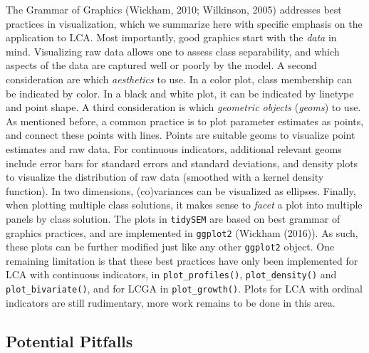 \documentclass[
  ,man,floatsintext]{apa6}
\begin{document}
The Grammar of Graphics (Wickham, 2010; Wilkinson, 2005)
addresses best practices in visualization,
which we summarize here with specific emphasis on the application to LCA.
Most importantly, good graphics start with the \emph{data} in mind.
Visualizing raw data allows one to assess class separability,
and which aspects of the data are captured well or poorly by the model.
A second consideration are which \emph{aesthetics} to use.
In a color plot, class membership can be indicated by color.
In a black and white plot, it can be indicated by linetype and point shape.
A third consideration is which \emph{geometric objects} (\emph{geoms}) to use.
As mentioned before, a common practice is to plot parameter estimates as points,
and connect these points with lines.
Points are suitable geoms to visualize point estimates and raw data.
For continuous indicators, additional relevant geoms include error bars for standard errors and standard deviations,
and density plots to visualize the distribution of raw data (smoothed with a kernel density function).
In two dimensions, (co)variances can be visualized as ellipses.
Finally, when plotting multiple class solutions,
it makes sense to \emph{facet} a plot into multiple panels by class solution.
The plots in \texttt{tidySEM} are based on best grammar of graphics practices,
and are implemented in \texttt{ggplot2} (Wickham (2016)).
As such, these plots can be further modified just like any other \texttt{ggplot2} object.
One remaining limitation is that these best practices have only been implemented for LCA with continuous indicators, in \texttt{plot\_profiles()}, \texttt{plot\_density()} and \texttt{plot\_bivariate()}, and for LCGA in \texttt{plot\_growth()}. Plots for LCA with ordinal indicators are still rudimentary, more work remains to be done in this area.

\hypertarget{potential-pitfalls}{%
\subsection{Potential Pitfalls}\label{potential-pitfalls}}
\end{document}
